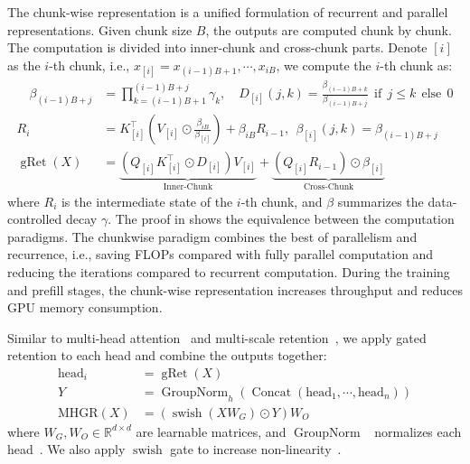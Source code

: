 The chunk-wise representation is a unified formulation of recurrent and parallel representations.
Given chunk size $B$, the outputs are computed chunk by chunk.
The computation is divided into inner-chunk and cross-chunk parts.
Denote ${[i]}$ as the $i$-th chunk, i.e., $x_{[i]} = x_{(i-1)B+1} , \cdots , x_{iB}$, we compute the $i$-th chunk as:
\begin{equation}
\begin{aligned}
\label{eq:gret:chunk}
\quad \beta_{(i-1)B+j} &= \prod_{k=(i-1)B+1}^{(i-1)B+j} \gamma_{k},\quad D_{[i]}(j,k)=\frac{\beta_{(i-1)B+k}}{\beta_{(i-1)B+j}}\ \ \mathrm{if}\ \ j \le k\ \ \mathrm{else}\ \ 0 \\
R_{i} &= K_{[i]}^\intercal (V_{[i]}\odot \frac{\beta_{iB}}{\beta_{[i]}})+\beta_{iB} R_{i-1},\ \ \beta_{[i]}(j,k)= \beta_{(i-1)B+j}\\
\operatorname{gRet} (X) &= \underbrace{ (Q_{[i]} K^\intercal_{[i]} \odot D_{[i]}) V_{[i]} }_{\text{Inner-Chunk}} + \underbrace{ (Q_{[i]} R_{i-1}) \odot \beta_{[i]}}_{\text{Cross-Chunk}}
\end{aligned}
\end{equation}
where $R_i$ is the intermediate state of the $i$-th chunk, and $\beta$ summarizes the data-controlled decay $\gamma$.
The proof in  shows the equivalence between the computation paradigms.
The chunkwise paradigm combines the best of parallelism and recurrence, i.e., saving FLOPs compared with fully parallel computation and reducing the iterations compared to recurrent computation.
During the training and prefill stages, the chunk-wise representation increases throughput and reduces GPU memory consumption.

Similar to multi-head attention~\cite{transformer} and multi-scale retention~\cite{retnet}, we apply gated retention to each head and combine the outputs together:
\begin{equation}
\begin{aligned}
\mathrm{head}_i &= \operatorname{gRet} (X) \\
Y &= \operatorname{GroupNorm}_{h}( \operatorname{Concat}(\mathrm{head}_1, \cdots, \mathrm{head}_n) ) \\
\mathrm{MHGR}(X) &= (\operatorname{swish}(X W_G) \odot Y) W_O
\label{eq:mhgr}
\end{aligned}
\end{equation}
where $W_G, W_O \in \mathbb{R}^{d\times d}$ are learnable matrices, and $\operatorname{GroupNorm}$~\cite{groupnorm} normalizes each head~\cite{magneto}.
We also apply $\operatorname{swish}$ gate to increase non-linearity~\cite{retnet}.

